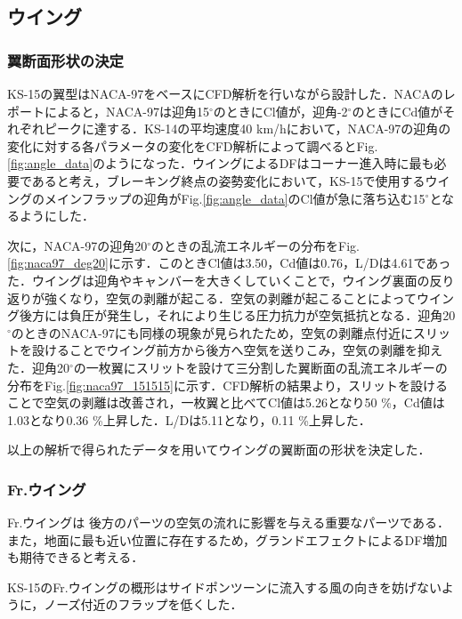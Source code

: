 \subsection{ウイング}
\subsubsection{翼断面形状の決定}
KS-15の翼型はNACA-97をベースにCFD解析を行いながら設計した．NACAのレポート\cite{NACA}によると，NACA-97は迎角15$^\circ$のときにCl値が，迎角-2$^\circ$のときにCd値がそれぞれピークに達する．KS-14の平均速度40 km/hにおいて，NACA-97の迎角の変化に対する各パラメータの変化をCFD解析によって調べるとFig.\ref{fig:angle_data}のようになった．ウイングによるDFはコーナー進入時に最も必要であると考え，ブレーキング終点の姿勢変化において，KS-15で使用するウイングのメインフラップの迎角がFig.\ref{fig:angle_data}のCl値が急に落ち込む15$^\circ$となるようにした．

次に，NACA-97の迎角20$^\circ$のときの乱流エネルギーの分布をFig.\ref{fig:naca97_deg20}に示す．このときCl値は3.50，Cd値は0.76，L/Dは4.61であった．ウイングは迎角やキャンバーを大きくしていくことで，ウイング裏面の反り返りが強くなり，空気の剥離が起こる．空気の剥離が起こることによってウイング後方には負圧が発生し，それにより生じる圧力抗力が空気抵抗となる．迎角20$^\circ$のときのNACA-97にも同様の現象が見られたため，空気の剥離点付近にスリットを設けることでウイング前方から後方へ空気を送りこみ，空気の剥離を抑えた．迎角20$^\circ$の一枚翼にスリットを設けて三分割した翼断面の乱流エネルギーの分布をFig.\ref{fig:naca97_151515}に示す．CFD解析の結果より，スリットを設けることで空気の剥離は改善され，一枚翼と比べてCl値は5.26となり50 \%，Cd値は1.03となり0.36 \%上昇した．L/Dは5.11となり，0.11 \%上昇した．

以上の解析で得られたデータを用いてウイングの翼断面の形状を決定した．

\subsubsection{Fr.ウイング}
Fr.ウイングは%
後方のパーツの空気の流れに影響を与える重要なパーツである．また，地面に最も近い位置に存在するため，グランドエフェクトによるDF増加も期待できると考える．

KS-15のFr.ウイングの概形はサイドポンツーンに流入する風の向きを妨げないように，ノーズ付近のフラップを低くした．

